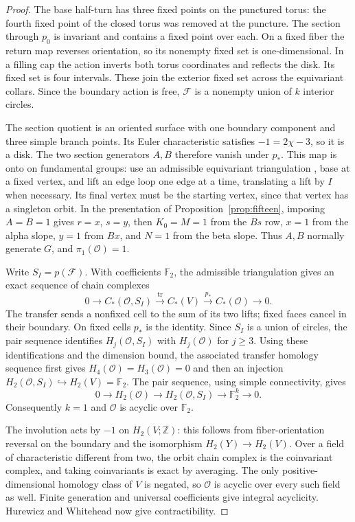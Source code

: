 \documentclass[11pt]{amsart}
\theoremstyle{definition}
\theoremstyle{remark}
\newcommand{\Z}{\mathbb Z}
\newcommand{\Ftwo}{\mathbb F_2}
\begin{document}
\begin{proof}
The base half-turn has three fixed points on the punctured torus:
the fourth fixed point of the closed torus was removed at the puncture.
The section through $p_0$ is invariant and contains a fixed point over
each. On a fixed fiber the return map reverses orientation, so its
nonempty fixed set is one-dimensional. In a filling cap the action
inverts both torus coordinates and reflects the disk. Its fixed set is
four intervals. These join the exterior fixed set across the equivariant
collars. Since the boundary action is free, $\mathcal F$ is a nonempty
union of $k$ interior circles.

The section quotient is an oriented surface with one boundary
component and three simple branch points. Its Euler characteristic
satisfies $-1=2\chi-3$, so it is a disk. The two section generators
$A,B$ therefore vanish under $p_*$. This map is onto on fundamental
groups: use an admissible equivariant triangulation \cite{Ill78},
base at a fixed vertex, and lift an edge loop one edge at a time,
translating a lift by $I$ when necessary. Its final vertex must be
the starting vertex, since that vertex has a singleton orbit.
In the presentation of Proposition~\ref{prop:fifteen}, imposing
$A=B=1$ gives $r=x$, $s=y$, then $K_0=M=1$ from the $Bs$ row,
$x=1$ from the alpha slope, $y=1$ from $Bx$, and $N=1$ from
the beta slope. Thus $A,B$ normally generate $G$, and
$\pi_1(\mathcal O)=1$.

Write $S_I=p(\mathcal F)$. With coefficients $\Ftwo$, the
admissible triangulation gives an exact sequence of chain complexes
\[
 0\longrightarrow C_*(\mathcal O,S_I)
 \xrightarrow{\mathrm{tr}}C_*(V)
 \xrightarrow{p_*}C_*(\mathcal O)\longrightarrow0.
\]
The transfer sends a nonfixed cell to the sum of its two lifts;
fixed faces cancel in their boundary. On fixed cells $p_*$ is the
identity. Since $S_I$ is a union of circles, the pair sequence
identifies $H_j(\mathcal O,S_I)$ with $H_j(\mathcal O)$ for
$j\ge3$. Using these identifications and the dimension bound,
the associated transfer homology sequence first gives
$H_4(\mathcal O)=H_3(\mathcal O)=0$ and then an injection
$H_2(\mathcal O,S_I)\hookrightarrow H_2(V)=\Ftwo$.
The pair sequence, using simple connectivity, gives
\[
 0\longrightarrow H_2(\mathcal O)
 \longrightarrow H_2(\mathcal O,S_I)
 \longrightarrow\Ftwo^k\longrightarrow0.
\]
Consequently $k=1$ and $\mathcal O$ is acyclic over $\Ftwo$.

The involution acts by $-1$ on $H_2(V;\Z)$: this follows from
fiber-orientation reversal on the boundary and the isomorphism
$H_2(Y)\to H_2(V)$. Over a field of characteristic different from
two, the orbit chain complex is the coinvariant complex, and taking
coinvariants is exact by averaging. The only positive-dimensional
homology class of $V$ is negated, so $\mathcal O$ is acyclic over
every such field as well. Finite generation and universal coefficients
give integral acyclicity. Hurewicz and Whitehead now give contractibility.


\end{proof}
\end{document}
